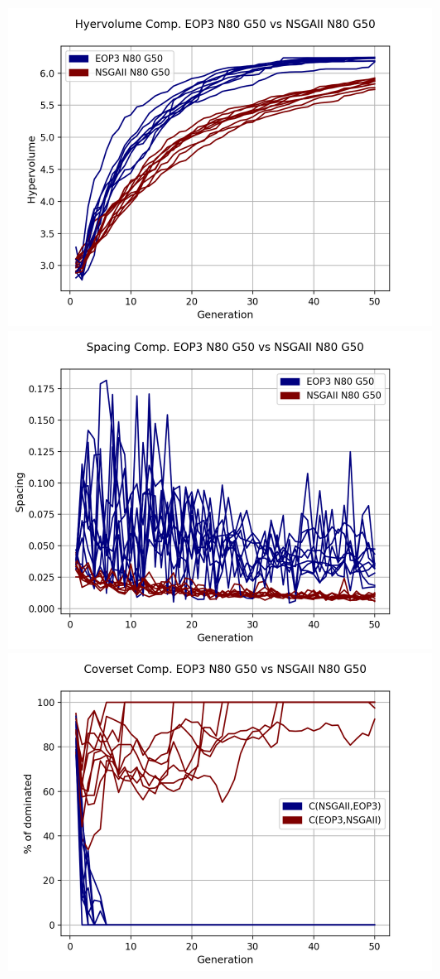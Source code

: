 \begin{figure}[H]
\includegraphics[scale=0.35]{../METRICS_PLOTS/Hypervol_COMP_EOP3N80G50_NSGAIIN80G50.png}
\includegraphics[scale=0.35]{../METRICS_PLOTS/Spacing_COMP_EOP3N80G50_NSGAIIN80G50.png}
\includegraphics[scale=0.35]{../METRICS_PLOTS/CoverSet_COMP_EOP3N80G50_NSGAIIN80G50.png}\\

\end{figure}
